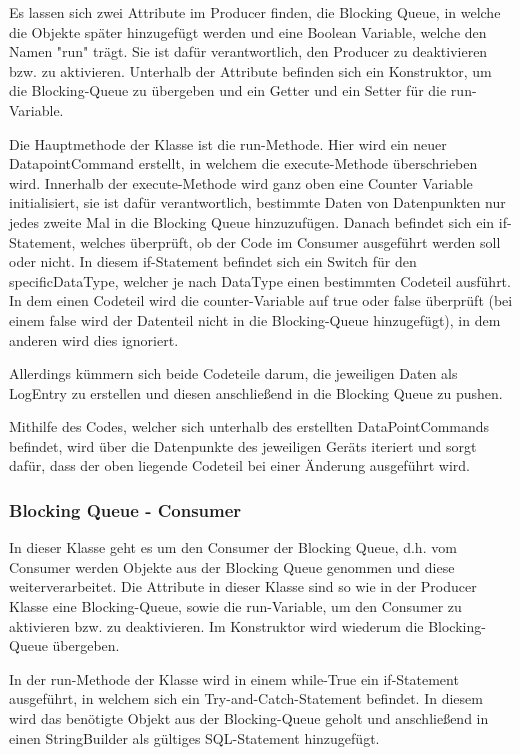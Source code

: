Es lassen sich zwei Attribute im Producer finden, die Blocking Queue, in welche die Objekte später hinzugefügt werden und eine Boolean Variable, welche den Namen "run" trägt. Sie ist dafür verantwortlich, den Producer zu deaktivieren bzw. zu aktivieren. Unterhalb der Attribute befinden sich ein Konstruktor, um die Blocking-Queue zu übergeben und ein Getter und ein Setter für die run-Variable.
 
Die Hauptmethode der Klasse ist die run-Methode. Hier wird ein neuer DatapointCommand erstellt, in welchem die execute-Methode überschrieben wird. Innerhalb der execute-Methode wird ganz oben eine Counter Variable initialisiert, sie ist dafür verantwortlich, bestimmte Daten von Datenpunkten nur jedes zweite Mal in die Blocking Queue hinzuzufügen. Danach befindet sich ein if-Statement, welches überprüft, ob der Code im Consumer ausgeführt werden soll oder nicht. In diesem if-Statement befindet sich ein Switch für den specificDataType, welcher je nach DataType einen bestimmten Codeteil ausführt. In dem einen Codeteil wird die counter-Variable auf true oder false überprüft (bei einem false wird der Datenteil nicht in die Blocking-Queue hinzugefügt), in dem anderen wird dies ignoriert.
 
Allerdings kümmern sich beide Codeteile darum, die jeweiligen Daten als LogEntry zu erstellen und diesen anschließend in die Blocking Queue zu pushen.
 
Mithilfe des Codes, welcher sich unterhalb des erstellten DataPointCommands befindet, wird über die Datenpunkte des jeweiligen Geräts iteriert und sorgt dafür, dass der oben liegende Codeteil bei einer Änderung ausgeführt wird. 
 
\subsubsection{Blocking Queue - Consumer }
In dieser Klasse geht es um den Consumer der Blocking Queue, d.h. vom Consumer werden Objekte aus der Blocking Queue genommen und diese weiterverarbeitet. Die Attribute in dieser Klasse sind so wie in der Producer Klasse eine Blocking-Queue, sowie die run-Variable, um den Consumer zu aktivieren bzw. zu deaktivieren. Im Konstruktor wird wiederum die Blocking-Queue übergeben.
 
In der run-Methode der Klasse wird in einem while-True ein if-Statement ausgeführt, in welchem sich ein Try-and-Catch-Statement befindet. In diesem wird das benötigte Objekt aus der Blocking-Queue geholt und anschließend in einen StringBuilder als gültiges SQL-Statement hinzugefügt.
 
